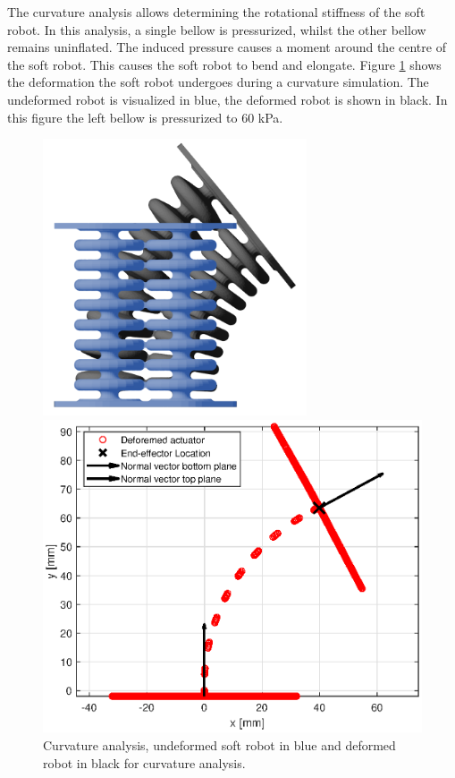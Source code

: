 The curvature analysis allows determining the rotational stiffness of the soft robot. In this analysis, a single bellow is pressurized, whilst the other bellow remains uninflated. The induced pressure causes a moment around the centre of the soft robot. This causes the soft robot to bend and elongate. Figure \ref{fig3:schematiccurvature} shows the deformation the soft robot undergoes during a curvature simulation. The undeformed robot is visualized in blue, the deformed robot is shown in black. In this figure the left bellow is pressurized to 60 kPa.



\begin{figure}[H]
    \centering
\begin{minipage}{0.5\textwidth}
        \centering
        \includegraphics[width=0.695\textwidth]{Figures/Chapter3/curvature.png} 
        \caption{Curvature analysis, undeformed soft robot in blue and deformed robot in black for curvature analysis. }
        \label{fig3:schematiccurvature}
    \end{minipage}\hfill
    \begin{minipage}{0.5\textwidth}
        \centering
        \includegraphics[width=\textwidth]{Figures/Chapter3/rotation60kpa.eps} 

\end{minipage}
\end{figure}
